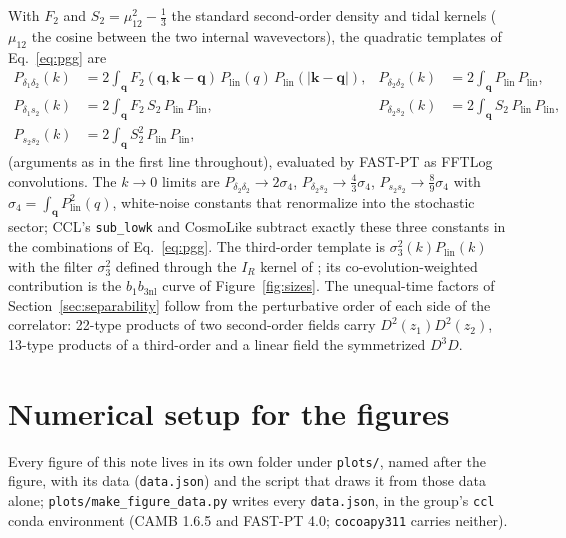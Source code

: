 \documentclass[11pt]{article}
\newcommand{\bone}{b_1}            %
\newcommand{\bthree}{b_{3\mathrm{nl}}} %
\newcommand{\plin}{P_{\mathrm{lin}}}
\begin{document}
With $F_2$ and $S_2 = \mu_{12}^2 - \tfrac{1}{3}$ the standard
second-order density and tidal kernels ($\mu_{12}$ the cosine between
the two internal wavevectors), the quadratic templates of
Eq.~\eqref{eq:pgg} are
\begin{align}
P_{\delta_1\delta_2}(k) &= 2\!\int_{\mathbf{q}}
 F_2(\mathbf{q},\mathbf{k}-\mathbf{q})\,
 \plin(q)\,\plin(|\mathbf{k}-\mathbf{q}|) , &
P_{\delta_2\delta_2}(k) &= 2\!\int_{\mathbf{q}}
 \plin\,\plin , \nonumber\\
P_{\delta_1 s_2}(k) &= 2\!\int_{\mathbf{q}}
 F_2\,S_2\,\plin\,\plin , &
P_{\delta_2 s_2}(k) &= 2\!\int_{\mathbf{q}}
 S_2\,\plin\,\plin , \nonumber\\
P_{s_2 s_2}(k) &= 2\!\int_{\mathbf{q}}
 S_2^2\,\plin\,\plin , &
&
\end{align}
(arguments as in the first line throughout), evaluated by FAST-PT as
FFTLog convolutions.  The $k\to0$ limits are
$P_{\delta_2\delta_2}\to 2\sigma_4$,
$P_{\delta_2 s_2}\to \tfrac{4}{3}\sigma_4$,
$P_{s_2 s_2}\to \tfrac{8}{9}\sigma_4$ with
$\sigma_4 = \int_{\mathbf{q}}\plin^2(q)$, white-noise constants that
renormalize into the stochastic sector; CCL's \texttt{sub\_lowk} and
CosmoLike subtract exactly these three constants in the combinations
of Eq.~\eqref{eq:pgg}.  The third-order template is
$\sigma_3^2(k)\plin(k)$ with the filter $\sigma_3^2$ defined through
the $I_R$ kernel of \cite{Saito2014}; its co-evolution-weighted
contribution is the $\bone\bthree$ curve of Figure~\ref{fig:sizes}.
The unequal-time factors of Section~\ref{sec:separability} follow from
the perturbative order of each side of the correlator: 22-type
products of two second-order fields carry $D^2(z_1)D^2(z_2)$, 13-type
products of a third-order and a linear field the symmetrized $D^3 D$.

\section{Numerical setup for the figures}
\label{app:numerics}

Every figure of this note lives in its own folder under
\texttt{plots/}, named after the figure, with its data
(\texttt{data.json}) and the script that draws it from those data
alone; \texttt{plots/make\_figure\_data.py} writes every
\texttt{data.json}, in the group's \texttt{ccl} conda environment
(CAMB 1.6.5 and FAST-PT 4.0; \texttt{cocoapy311} carries neither).
\end{document}
